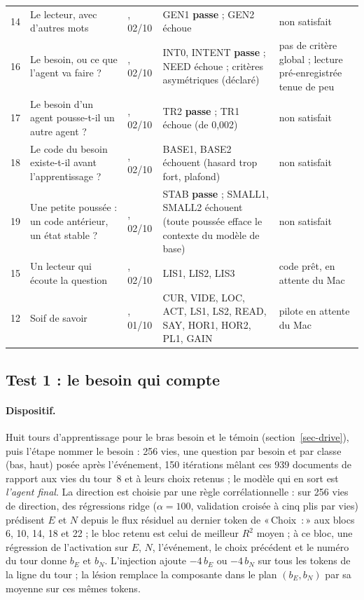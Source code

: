 \documentclass[11pt,a4paper]{article}
\newcommand{\passe}{\textbf{passe}}
\newcommand{\Choix}{«\,Choix~:\,»}
\newcommand{\code}[1]{\texttt{\detokenize{#1}}}
\begin{document}
\begin{table}[tp]
\begin{tabularx}{\textwidth}{@{}c >{\raggedright\arraybackslash}p{3.1cm} l >{\raggedright\arraybackslash}X >{\raggedright\arraybackslash}p{2.5cm}@{}}
14 & Le lecteur, avec d'autres mots & \code{6330c2c}, 02/10 & GEN1 \passe{} ; GEN2 échoue & non satisfait \\
16 & Le besoin, ou ce que l'agent va faire ? & \code{4f84752}, 02/10 & INT0, INTENT \passe{} ; NEED échoue ; critères asymétriques (déclaré) & pas de critère global ; lecture pré-enregistrée tenue de peu \\
17 & Le besoin d'un agent pousse-t-il un autre agent ? & \code{8e23605}, 02/10 & TR2 \passe{} ; TR1 échoue (de 0,002) & non satisfait \\
18 & Le code du besoin existe-t-il avant l'apprentissage ? & \code{b5b9a6f}, 02/10 & BASE1, BASE2 échouent (hasard trop fort, plafond) & non satisfait \\
19 & Une petite poussée : un code antérieur, un état stable ? & \code{0bf15d0}, 02/10 & STAB \passe{} ; SMALL1, SMALL2 échouent (toute poussée efface le contexte du modèle de base) & non satisfait \\
15 & Un lecteur qui écoute la question & \code{a448a03}, 02/10 & LIS1, LIS2, LIS3 & code prêt, en attente du Mac \\
12 & Soif de savoir & \code{017f2e5}, 01/10 & CUR, VIDE, LOC, ACT, LS1, LS2, READ, SAY, HOR1, HOR2, PL1, GAIN & pilote en attente du Mac \\
\bottomrule
\end{tabularx}
\end{table}

\subsection{Test 1 : le besoin qui compte}
\label{sec-t1}

\paragraph{Dispositif.} Huit tours d'apprentissage pour le bras \og besoin \fg{}
et le témoin (section~\ref{sec-drive}), puis l'étape \og nommer le besoin \fg{} :
256 vies, une question par besoin et par classe (bas, haut) posée après
l'événement, 150 itérations mêlant ces 939 documents de rapport aux vies du
tour~8 et à leurs choix retenus ; le modèle qui en sort est \emph{l'agent final}.
La direction est choisie par une règle corrélationnelle : sur 256 vies de
direction, des régressions ridge ($\alpha=100$, validation croisée à cinq plis par
vies) prédisent $E$ et $N$ depuis le flux résiduel au dernier token de \Choix{} aux
blocs 6, 10, 14, 18 et 22 ; le bloc retenu est celui de meilleur $R^2$ moyen ; à ce
bloc, une régression de l'activation sur $E$, $N$, l'événement, le choix précédent
et le numéro du tour donne $b_E$ et $b_N$. L'injection ajoute $-4\,b_E$ ou
$-4\,b_N$ sur tous les tokens de la ligne du tour ; la lésion remplace la
composante dans le plan $(b_E,b_N)$ par sa moyenne sur ces mêmes tokens.
\end{document}

